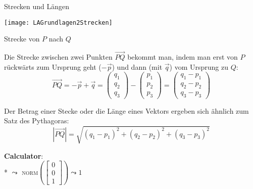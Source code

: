\clearpage
\begin{bla}{Strecken und Längen}
  \begin{marginfigure}[10em]
    \texttt{[image: LAGrundlagen2Strecken]}
    \caption{Strecke von $P$ nach $Q$}
  \end{marginfigure}
  Die Strecke zwischen zwei Punkten $\overrightarrow{PQ}$ bekommt man, indem man erst von $P$ rückwärts zum Ursprung geht ($-\vec{p}$) und dann (mit $\vec{q}$) vom Ursprung zu $Q$:
  \begin{equation*}
    \overrightarrow{PQ} = - \vec{p} + \vec{q} = \begin{pmatrix}
      q_1\\q_2\\q_3
    \end{pmatrix}
    -
    \begin{pmatrix}
      p_1\\p_2\\p_3
    \end{pmatrix}
    =
    \begin{pmatrix}
      q_1 - p_1 \\ q_2 - p_2 \\ q_3 - p_3
    \end{pmatrix}
  \end{equation*}

  Der Betrag einer Stecke oder die Länge eines Vektors ergeben sich ähnlich zum Satz des Pythagoras:
  \begin{equation*}
    |\overrightarrow{PQ}| = \sqrt{(q_1 - p_1)^2 + (q_2 - p_2)^2 + (q_3 - p_3)^2}
  \end{equation*}
   \begin{marginfigure}
    \begin{tcolorbox}[colback=white!95!black,colframe=white!75!black,title=CAS:,arc=0mm]
      \begin{scriptsize}
        \textbf{Calculator}: \\*
        \( \leadsto \) \textsc{norm}\( \left( \left[ \begin{smallmatrix}
          0 \\ 0 \\ 1
        \end{smallmatrix} \right] \right) \leadsto 1 \)
      \end{scriptsize}
    \end{tcolorbox}
  \end{marginfigure}
\end{bla}

